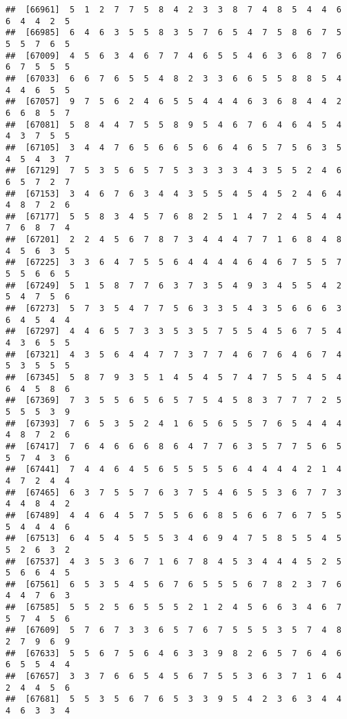 \documentclass[
]{book}
\begin{document}
\begin{verbatim}
##  [66961]  5  1  2  7  7  5  8  4  2  3  3  8  7  4  8  5  4  4  6  6  4  4  2  5
##  [66985]  6  4  6  3  5  5  8  3  5  7  6  5  4  7  5  8  6  7  5  5  5  7  6  5
##  [67009]  4  5  6  3  4  6  7  7  4  6  5  5  4  6  3  6  8  7  6  6  7  5  5  5
##  [67033]  6  6  7  6  5  5  4  8  2  3  3  6  6  5  5  8  8  5  4  4  4  6  5  5
##  [67057]  9  7  5  6  2  4  6  5  5  4  4  4  6  3  6  8  4  4  2  6  6  8  5  7
##  [67081]  5  8  4  4  7  5  5  8  9  5  4  6  7  6  4  6  4  5  4  4  3  7  5  5
##  [67105]  3  4  4  7  6  5  6  6  5  6  6  4  6  5  7  5  6  3  5  4  5  4  3  7
##  [67129]  7  5  3  5  6  5  7  5  3  3  3  3  4  3  5  5  2  4  6  6  5  7  2  7
##  [67153]  3  4  6  7  6  3  4  4  3  5  5  4  5  4  5  2  4  6  4  4  8  7  2  6
##  [67177]  5  5  8  3  4  5  7  6  8  2  5  1  4  7  2  4  5  4  4  7  6  8  7  4
##  [67201]  2  2  4  5  6  7  8  7  3  4  4  4  7  7  1  6  8  4  8  4  5  6  3  5
##  [67225]  3  3  6  4  7  5  5  6  4  4  4  4  6  4  6  7  5  5  7  5  5  6  6  5
##  [67249]  5  1  5  8  7  7  6  3  7  3  5  4  9  3  4  5  5  4  2  5  4  7  5  6
##  [67273]  5  7  3  5  4  7  7  5  6  3  3  5  4  3  5  6  6  6  3  6  4  5  4  4
##  [67297]  4  4  6  5  7  3  3  5  3  5  7  5  5  4  5  6  7  5  4  4  3  6  5  5
##  [67321]  4  3  5  6  4  4  7  7  3  7  7  4  6  7  6  4  6  7  4  5  3  5  5  5
##  [67345]  5  8  7  9  3  5  1  4  5  4  5  7  4  7  5  5  4  5  4  6  4  5  8  6
##  [67369]  7  3  5  5  6  5  6  5  7  5  4  5  8  3  7  7  7  2  5  5  5  5  3  9
##  [67393]  7  6  5  3  5  2  4  1  6  5  6  5  5  7  6  5  4  4  4  4  8  7  2  6
##  [67417]  7  6  4  6  6  6  8  6  4  7  7  6  3  5  7  7  5  6  5  5  7  4  3  6
##  [67441]  7  4  4  6  4  5  6  5  5  5  5  6  4  4  4  4  2  1  4  4  7  2  4  4
##  [67465]  6  3  7  5  5  7  6  3  7  5  4  6  5  5  3  6  7  7  3  4  4  8  4  2
##  [67489]  4  4  6  4  5  7  5  5  6  6  8  5  6  6  7  6  7  5  5  5  4  4  4  6
##  [67513]  6  4  5  4  5  5  5  3  4  6  9  4  7  5  8  5  5  4  5  5  2  6  3  2
##  [67537]  4  3  5  3  6  7  1  6  7  8  4  5  3  4  4  4  5  2  5  5  6  6  4  5
##  [67561]  6  5  3  5  4  5  6  7  6  5  5  5  6  7  8  2  3  7  6  4  4  7  6  3
##  [67585]  5  5  2  5  6  5  5  5  2  1  2  4  5  6  6  3  4  6  7  5  7  4  5  6
##  [67609]  5  7  6  7  3  3  6  5  7  6  7  5  5  5  3  5  7  4  8  2  7  9  6  9
##  [67633]  5  5  6  7  5  6  4  6  3  3  9  8  2  6  5  7  6  4  6  6  5  5  4  4
##  [67657]  3  3  7  6  6  5  4  5  6  7  5  5  3  6  3  7  1  6  4  2  4  4  5  6
##  [67681]  5  5  3  5  6  7  6  5  3  3  9  5  4  2  3  6  3  4  4  4  6  3  3  4

\end{verbatim}
\end{document}

